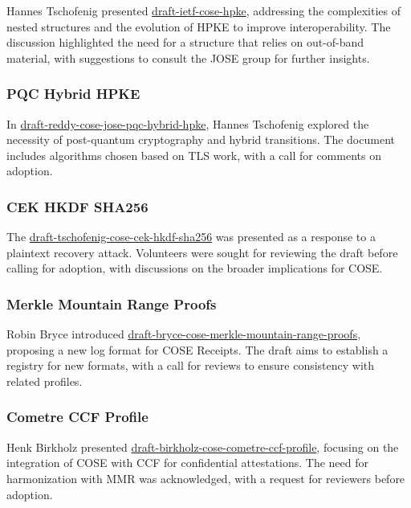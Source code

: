 \documentclass{article}
\begin{document}
Hannes Tschofenig presented \href{https://datatracker.ietf.org/doc/html/draft-ietf-cose-hpke}{draft-ietf-cose-hpke}, addressing the complexities of nested structures and the evolution of HPKE to improve interoperability. The discussion highlighted the need for a structure that relies on out-of-band material, with suggestions to consult the JOSE group for further insights.

\subsubsection{PQC Hybrid HPKE}

In \href{https://datatracker.ietf.org/doc/html/draft-reddy-cose-jose-pqc-hybrid-hpke}{draft-reddy-cose-jose-pqc-hybrid-hpke}, Hannes Tschofenig explored the necessity of post-quantum cryptography and hybrid transitions. The document includes algorithms chosen based on TLS work, with a call for comments on adoption.

\subsubsection{CEK HKDF SHA256}

The \href{https://datatracker.ietf.org/doc/html/draft-tschofenig-cose-cek-hkdf-sha256}{draft-tschofenig-cose-cek-hkdf-sha256} was presented as a response to a plaintext recovery attack. Volunteers were sought for reviewing the draft before calling for adoption, with discussions on the broader implications for COSE.

\subsubsection{Merkle Mountain Range Proofs}

Robin Bryce introduced \href{https://datatracker.ietf.org/doc/html/draft-bryce-cose-merkle-mountain-range-proofs}{draft-bryce-cose-merkle-mountain-range-proofs}, proposing a new log format for COSE Receipts. The draft aims to establish a registry for new formats, with a call for reviews to ensure consistency with related profiles.

\subsubsection{Cometre CCF Profile}

Henk Birkholz presented \href{https://datatracker.ietf.org/doc/html/draft-birkholz-cose-cometre-ccf-profile}{draft-birkholz-cose-cometre-ccf-profile}, focusing on the integration of COSE with CCF for confidential attestations. The need for harmonization with MMR was acknowledged, with a request for reviewers before adoption.
\end{document}
